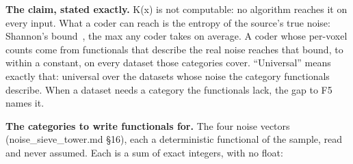 \textbf{The claim, stated exactly.} K(x) is not computable: no algorithm reaches it on every input. What a coder can reach is the entropy of the source's true noise: Shannon's bound~\cite{src:Shannon}, the max any coder takes on average. A coder whose per-voxel counts come from functionals that describe the real noise reaches that bound, to within a constant, on every dataset those categories cover. “Universal” means exactly that: universal over the datasets whose noise the category functionals describe. When a dataset needs a category the functionals lack, the gap to F5 names it.

\textbf{The categories to write functionals for.} The four noise vectors (noise\_\allowbreak{}sieve\_\allowbreak{}tower.md §16), each a deterministic functional of the sample, read and never assumed. Each is a sum of exact integers, with no float:

